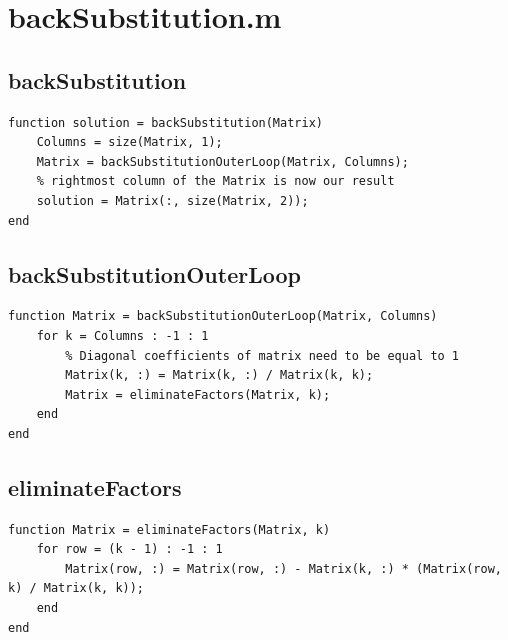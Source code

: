 \section{backSubstitution.m}
\subsection{backSubstitution}
\begin{simplechar}
\begin{lstlisting}
function solution = backSubstitution(Matrix)
    Columns = size(Matrix, 1);
    Matrix = backSubstitutionOuterLoop(Matrix, Columns);
    % rightmost column of the Matrix is now our result
    solution = Matrix(:, size(Matrix, 2));
end
\end{lstlisting}
\end{simplechar}

\subsection{backSubstitutionOuterLoop}
\begin{simplechar}
\begin{lstlisting}
function Matrix = backSubstitutionOuterLoop(Matrix, Columns)
    for k = Columns : -1 : 1
        % Diagonal coefficients of matrix need to be equal to 1
        Matrix(k, :) = Matrix(k, :) / Matrix(k, k);
        Matrix = eliminateFactors(Matrix, k);
    end
end
\end{lstlisting}
\end{simplechar}

\subsection{eliminateFactors}
\begin{simplechar}
\begin{lstlisting}
function Matrix = eliminateFactors(Matrix, k)
    for row = (k - 1) : -1 : 1
        Matrix(row, :) = Matrix(row, :) - Matrix(k, :) * (Matrix(row, k) / Matrix(k, k));
    end
end

\end{lstlisting}
\end{simplechar}

